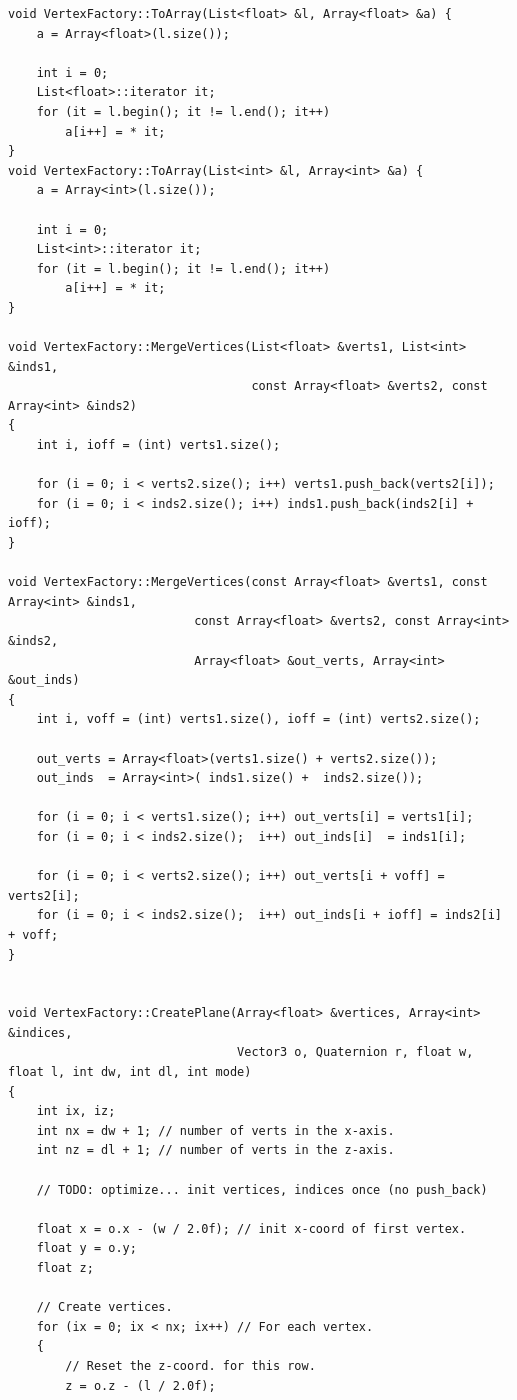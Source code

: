 \begin{lstlisting}[caption= The \texttt{VertexFactory} class]
void VertexFactory::ToArray(List<float> &l, Array<float> &a) {
    a = Array<float>(l.size());
    
    int i = 0;
    List<float>::iterator it;
    for (it = l.begin(); it != l.end(); it++)
        a[i++] = * it;
}
void VertexFactory::ToArray(List<int> &l, Array<int> &a) {
    a = Array<int>(l.size());
    
    int i = 0;
    List<int>::iterator it;
    for (it = l.begin(); it != l.end(); it++)
        a[i++] = * it;
}

void VertexFactory::MergeVertices(List<float> &verts1, List<int> &inds1,
                                  const Array<float> &verts2, const Array<int> &inds2)
{
    int i, ioff = (int) verts1.size();
    
    for (i = 0; i < verts2.size(); i++) verts1.push_back(verts2[i]);
    for (i = 0; i < inds2.size(); i++) inds1.push_back(inds2[i] + ioff);
}

void VertexFactory::MergeVertices(const Array<float> &verts1, const Array<int> &inds1,
                          const Array<float> &verts2, const Array<int> &inds2,
                          Array<float> &out_verts, Array<int> &out_inds) 
{
    int i, voff = (int) verts1.size(), ioff = (int) verts2.size();
    
    out_verts = Array<float>(verts1.size() + verts2.size());
    out_inds  = Array<int>( inds1.size() +  inds2.size());
    
    for (i = 0; i < verts1.size(); i++) out_verts[i] = verts1[i];
    for (i = 0; i < inds2.size();  i++) out_inds[i]  = inds1[i];
    
    for (i = 0; i < verts2.size(); i++) out_verts[i + voff] = verts2[i];
    for (i = 0; i < inds2.size();  i++) out_inds[i + ioff] = inds2[i] + voff;
}


void VertexFactory::CreatePlane(Array<float> &vertices, Array<int> &indices, 
                                Vector3 o, Quaternion r, float w, float l, int dw, int dl, int mode)
{
    int ix, iz;
    int nx = dw + 1; // number of verts in the x-axis.
    int nz = dl + 1; // number of verts in the z-axis.
    
    // TODO: optimize... init vertices, indices once (no push_back)
    
    float x = o.x - (w / 2.0f); // init x-coord of first vertex.
    float y = o.y;
    float z;
    
    // Create vertices.
    for (ix = 0; ix < nx; ix++) // For each vertex.
    {
        // Reset the z-coord. for this row.
        z = o.z - (l / 2.0f);
        

\end{lstlisting}
